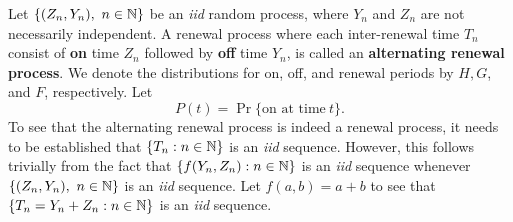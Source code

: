 \documentclass[a4paper,10pt,english]{article}
\begin{document}
Let $\{(Z_n,Y_n),~n \in \mathbb{N}\}$ be an \textit{iid} random process, where $Y_n$ and $Z_n$ are not necessarily independent. 
A renewal process where each inter-renewal time $T_n$ consist of \textbf{on} time $Z_n$ followed by \textbf{off} time $Y_n$, is called an \textbf{alternating renewal process}. 
We denote the distributions for on, off, and renewal periods by $H, G$, and $F$, respectively. Let 
\begin{equation*}
P(t)=\Pr\{\text{on at time}~ t\}.
\end{equation*}
To see that the alternating renewal process is indeed a renewal process, it needs to be established that $\{T_n:n\in\mathbb{N}\}$ is an \textit{iid} sequence. 
However, this follows trivially from the fact that $\{f(Y_n,Z_n):n\in\mathbb{N}\}$ is an \textit{iid} sequence whenever $\{(Z_n,Y_n),~n \in \mathbb{N}\}$ is an \textit{iid} sequence. 
Let $f(a,b) = a+b$ to see that $\{T_n = Y_n + Z_n: n\in\mathbb{N}\}$ is an \textit{iid} sequence.
\end{document}
